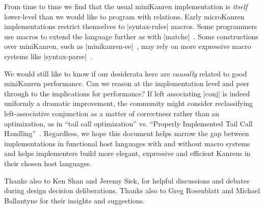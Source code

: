 \documentclass[sigplan,draft,natbib=false]{acmart}
\begin{document}
From time to time we find that the usual miniKanren implementation is
\emph{itself} lower-level than we would like to program with
relations. Early microKanren implementations restrict themselves to
\rackinline|syntax-rules| macros. Some programmers use macros to
extend the language further as with
\rackinline|matche|~\cite{keep2009pattern}. Some constructions over
miniKanren, such as
\rackinline|minikanren-ee|~\cite{ballantyne2020macros}, may rely on
more expressive macro systems like
\rackinline|syntax-parse|~\cite{culpepper2012fortifying}.

We would still like to know if our desiderata here are \emph{causally}
related to good miniKanren performance. Can we reason at the
implementation level and peer through to the implications for
performance? If left associating \rackinline|conj| is indeed uniformly
a dramatic improvement, the community might consider reclassifying
left-associative conjunction as a matter of correctness rather than an
optimization, as in \enquote{tail call optimization} vs.
\enquote{Properly Implemented Tail Call
  Handling}~\cite{felleisen2014requestions}. Regardless, we hope this
document helps narrow the gap between implementations in functional
host languages with and without macro systems and helps implementers
build more elegant, expressive and efficient Kanrens in their chosen
host languages.

\begin{acks}

  Thanks also to Ken Shan and Jeremy Siek, for helpful discussions and
  debates during design decision deliberations. Thanks also to Greg
  Rosenblatt and Michael Ballantyne for their insights and
  suggestions.

\end{acks}

\printbibliography{}
\end{document}
